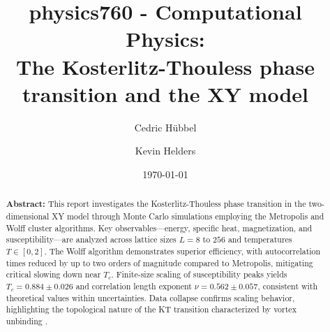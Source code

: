 \documentclass[reprint, aps, amsmath, amssymb, nofootinbib, floatfix]{revtex4-2}
\begin{document}

\title{
  physics760 - Computational Physics:\texorpdfstring{\\
    The Kosterlitz-Thouless phase transition and the XY model
  }{}
}

\author{Cedric Hübbel}
\author{Kevin Helders}


\date{\today}


\begin{abstract}

\noindent \textbf{Abstract:} This report investigates the Kosterlitz-Thouless phase transition in the two-dimensional XY model through Monte Carlo simulations employing the Metropolis and Wolff cluster algorithms. Key observables---energy, specific heat, magnetization, and susceptibility---are analyzed across lattice sizes $L=8$ to $256$ and temperatures $T \in [0,2]$. The Wolff algorithm demonstrates superior efficiency, with autocorrelation times reduced by up to two orders of magnitude compared to Metropolis, mitigating critical slowing down near $T_c$. Finite-size scaling of susceptibility peaks yields $T_c = 0.884 \pm 0.026$ and correlation length exponent $\nu = 0.562 \pm 0.057$, consistent with theoretical values within uncertainties. Data collapse confirms scaling behavior, highlighting the topological nature of the KT transition characterized by vortex unbinding \cite{Hasenbusch2008}.
\end{abstract}

\maketitle


%







\end{document}
